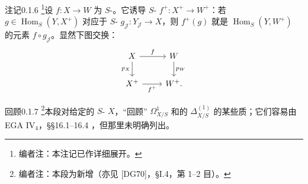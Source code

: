 \begin{SGAresult}{注记}{0.1.6}
\footnote{编者注：本注记已作详细展开。}设 $f:X\to W$ 为 $S$-。它诱导 $S$- $f^+:X^+\to W^+$：若 $g\in\operatorname{Hom}_S(Y,X^+)$ 对应于 $S$- $g_{\mathcal J}:Y_{\mathcal J}\to X$，则 $f^+(g)$ 就是 $\operatorname{Hom}_S(Y,W^+)$ 的元素 $f\circ g_{\mathcal J}$。显然下图交换：
\[\begin{tikzcd}X\arrow[r,"f"]\arrow[d,"p_X"']&W\arrow[d,"p_W"]\\X^+\arrow[r,"f^+"']&W^+.\end{tikzcd}\]
\end{SGAresult}
\begin{SGAresult}{回顾}{0.1.7}
\footnote{编者注：本段为新增（亦见 [DG70]，§I.4，第 1--2 目）。}本段对给定的 $S$- $X$，“回顾” $\Omega^1_{X/S}$ 和的 $\Delta^{(1)}_{X/S}$ 的某些质；它们容易由 EGA IV$_4$，§§16.1--16.4 ，但那里未明确列出。


\end{SGAresult}
